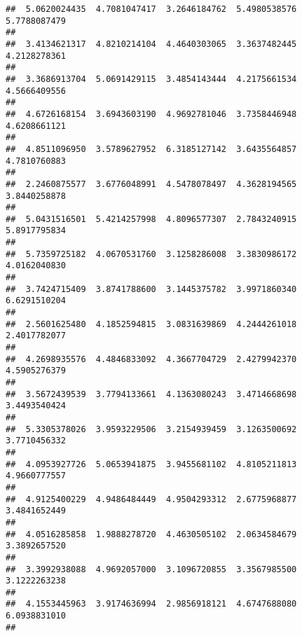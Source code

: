 \documentclass[]{article}
\begin{document}
\begin{verbatim}
##  5.0620024435  4.7081047417  3.2646184762  5.4980538576  5.7788087479 
##                                                                       
##  3.4134621317  4.8210214104  4.4640303065  3.3637482445  4.2128278361 
##                                                                       
##  3.3686913704  5.0691429115  3.4854143444  4.2175661534  4.5666409556 
##                                                                       
##  4.6726168154  3.6943603190  4.9692781046  3.7358446948  4.6208661121 
##                                                                       
##  4.8511096950  3.5789627952  6.3185127142  3.6435564857  4.7810760883 
##                                                                       
##  2.2460875577  3.6776048991  4.5478078497  4.3628194565  3.8440258878 
##                                                                       
##  5.0431516501  5.4214257998  4.8096577307  2.7843240915  5.8917795834 
##                                                                       
##  5.7359725182  4.0670531760  3.1258286008  3.3830986172  4.0162040830 
##                                                                       
##  3.7424715409  3.8741788600  3.1445375782  3.9971860340  6.6291510204 
##                                                                       
##  2.5601625480  4.1852594815  3.0831639869  4.2444261018  2.4017782077 
##                                                                       
##  4.2698935576  4.4846833092  4.3667704729  2.4279942370  4.5905276379 
##                                                                       
##  3.5672439539  3.7794133661  4.1363080243  3.4714668698  3.4493540424 
##                                                                       
##  5.3305378026  3.9593229506  3.2154939459  3.1263500692  3.7710456332 
##                                                                       
##  4.0953927726  5.0653941875  3.9455681102  4.8105211813  4.9660777557 
##                                                                       
##  4.9125400229  4.9486484449  4.9504293312  2.6775968877  3.4841652449 
##                                                                       
##  4.0516285858  1.9888278720  4.4630505102  2.0634584679  3.3892657520 
##                                                                       
##  3.3992938088  4.9692057000  3.1096720855  3.3567985500  3.1222263238 
##                                                                       
##  4.1553445963  3.9174636994  2.9856918121  4.6747688080  6.0938831010 
##                                                                       

\end{verbatim}
\end{document}
